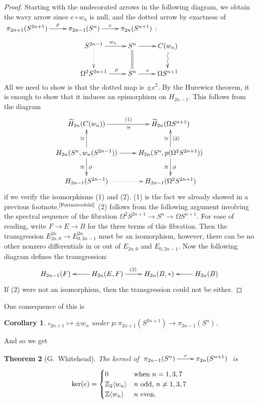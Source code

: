 \documentclass{article}
\newcommand{\Z}{\mathbb{Z}}
\newcommand{\Loops}{\Omega}
\renewcommand{\to}{\longrightarrow}
\renewcommand{\mapsto}{\longmapsto}
\newtheorem{thm}{Theorem}[section]
\newtheorem{cor}[thm]{Corollary}
\theoremstyle{definition}
\begin{document}
\begin{proof}
Starting with the undecorated arrows in the following diagram, we obtain the wavy arrow since $e\circ w_n$ is null, and the dotted arrow by exactness of  $\xymatrix{\pi_{2n+1}(S^{2n+1})\ar[r]^{\ \ p}&\pi_{2n-1}(S^n)\ar[r]^e&\pi_{2n}(S^{n+1})}$:
\[\xymatrix{
\ar@{..>}[d]S^{2n-1}  \ar[r]^{w_n} & S^n \ar[r]\ar@{=}[d] & C(w_n)\ar@{~>}[d] \\
\Loops^2 S^{2n+1} \ar[r]^{\ \ \ p} & S^n \ar[r]^{e\ \ } & \Loops S^{n+1}
}\]
All we need to show is that the dotted map is $\pm e^2$. By the Hurewicz theorem, it is enough to show that it induces an epimorphism on $H_{2n-1}$. This follows from the diagram
\[\xymatrix{
\widetilde H_{2n} (C (w_n)) \ar[r]^{(1)}_\cong & \widetilde H_{2n} (\Loops S^{n+1}) \\
H_{2n}(S^n, w_n (S^{2n-1})) \ar[r] 
\ar[u]^{\cong}\ar[d]_\cong^\partial
& H_{2n}(S^n, p(\Loops^2 S^{2n+1}) )
\ar[u]^{\cong}_{(2)}\ar[d]_\cong^\partial
\\
H_{2n-1} (S^{2n-1}) \ar@{..>}[r] & H_{2n-1} (\Loops^2 S^{2n+1})
}\]
if we verify the isomorphisms (1) and (2).  (1) is the fact we already showed in a previous footnote.$^\text{\ref{Fottnoteofold}}$  (2) follows from the following argument involving the spectral sequence of the fibration $\Loops^2 S^{2n+1} \to S^n \to \Loops S^{n+1}$. For ease of reading, write $F\to E\to B$ for the three terms of this fibration. Then the transgression $E^{2n}_{2n,0}\to E^{2n}_{0,2n-1}$ must be an isomorphism, however, there can be no other nonzero differentials in or out of $E_{2n,0}$ and $E_{0,2n-1}$. Now the following diagram defines the transgression:
\[\xymatrix{
H_{2n-1}(F)&\ar[l]H_{2n}(E,F)\ar[r]^{(2)}&H_{2n}(B,*)&%
H_{2n}(B)\ar[l]
}\]
If (2) were not an isomorphism, then the transgression could not be either.
\end{proof}
One consequence of this is
\begin{cor}
$\iota_{2n+1} \mapsto \pm w_n$ under $p:\pi_{2n+1}(S^{2n+1})\to\pi_{2n-1}(S^n)$.
\end{cor}
And so we get
\begin{thm}[G.\ Whitehead]
The kernel of $\xymatrix{\pi_{2n-1}(S^n)\ar[r]^e&\pi_{2n}(S^{n+1})}$\!\! is
%
\[
\ker(e) = \begin{cases} 0 & \hbox{when $n = 1, 3, 7$} \\ \Z_2 \langle w_n \rangle & \hbox{$n$ odd, $n\neq1,3,7$} \\ \Z \langle w_n \rangle & \hbox{$n$ even}. \end{cases}
\]
\end{thm}
\end{document}
